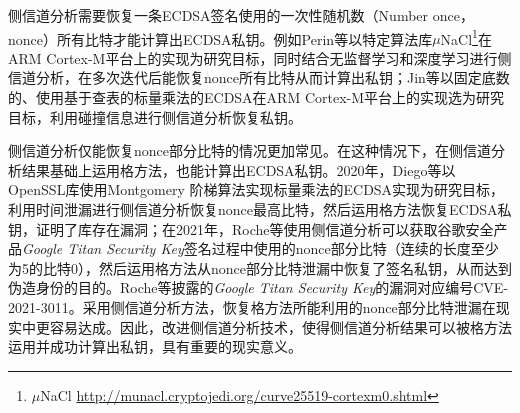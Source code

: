 {	侧信道分析需要恢复一条ECDSA签名使用的一次性随机数（Number once， nonce）所有比特才能计算出ECDSA私钥。例如Perin等\citep{Perin20}以特定算法库$\mu$NaCl\footnote{$\mu$NaCl \href{http://munacl.cryptojedi.org/curve25519-cortexm0.shtml}{http://munacl.cryptojedi.org/curve25519-cortexm0.shtml}}在ARM Cortex-M平台上的实现为研究目标，同时结合无监督学习和深度学习进行侧信道分析，在多次迭代后能恢复nonce所有比特从而计算出私钥；Jin等\citep{Jin21}以固定底数的、使用基于查表的标量乘法的ECDSA在ARM Cortex-M平台上的实现选为研究目标，利用碰撞信息进行侧信道分析恢复私钥。
	
	侧信道分析仅能恢复nonce部分比特的情况更加常见。在这种情况下，在侧信道分析结果基础上运用格方法，也能计算出ECDSA私钥。2020年，Diego等\citep{Diego20}以OpenSSL库使用Montgomery 阶梯算法\citep{Cohen05,Blake05}实现标量乘法的ECDSA实现为研究目标，利用时间泄漏进行侧信道分析恢复nonce最高比特，然后运用格方法恢复ECDSA私钥，证明了库存在漏洞；在2021年，Roche等\citep{Roche21}使用侧信道分析可以获取谷歌安全产品\textit{Google Titan Security Key}\citep{Titan}签名过程中使用的nonce部分比特（连续的长度至少为5的比特0），然后运用格方法从nonce部分比特泄漏中恢复了签名私钥，从而达到伪造身份的目的。Roche等\citep{Roche21}披露的\textit{Google Titan Security Key}的漏洞对应编号CVE-2021-3011。采用侧信道分析方法，恢复格方法所能利用的nonce部分比特泄漏在现实中更容易达成。因此，改进侧信道分析技术，使得侧信道分析结果可以被格方法运用并成功计算出私钥，具有重要的现实意义。
	
	
	

}
